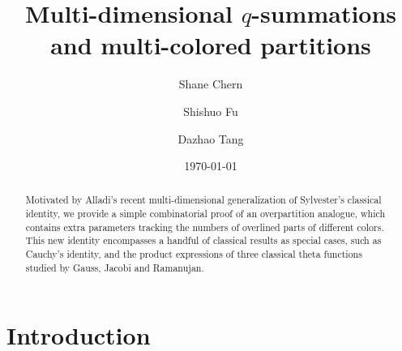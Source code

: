 \documentclass[12pt,reqno]{amsart}
\numberwithin{equation}{section}
\theoremstyle{plain}
\theoremstyle{definition}
\begin{document}
\title[Multi-dimensional $q$-summations]{Multi-dimensional $q$-summations and multi-colored partitions}

\author[S. Chern]{Shane Chern}
\address[Shane Chern]{Department of Mathematics, The Pennsylvania State University, University Park, PA 16802, USA}

\author[S. Fu]{Shishuo Fu}
\address[Shishuo Fu]{College of Mathematics and Statistics, Chongqing University, Huxi campus LD506, Chongqing 401331, P.R. China}


\author[D. Tang]{Dazhao Tang}

\address[Dazhao Tang]{College of Mathematics and Statistics, Chongqing University, Huxi campus LD208, Chongqing 401331, P.R. China}

\date{\today}


\begin{abstract}
Motivated by Alladi's recent multi-dimensional generalization of Sylvester's classical identity, we provide a simple combinatorial proof of an overpartition analogue, which contains extra parameters tracking the numbers of overlined parts of different colors. This new identity encompasses a handful of classical results as special cases, such as Cauchy's identity, and the product expressions of three classical theta functions studied by Gauss, Jacobi and Ramanujan.
\end{abstract}



\maketitle




\section{Introduction}\label{sec1}
\end{document}
